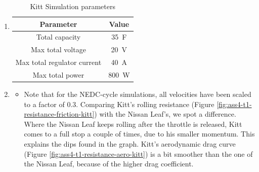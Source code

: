 \documentclass[11pt,titlepage]{report}
\begin{document}
\begin{enumerate}
\item
	\begin{table}[H]
		\centering
		\caption{Kitt Simulation parameters}
		\label{tab:ass4-sim-param-cap}
		\begin{tabular}{c c}
			\hline\hline
			Parameter & Value \\
			\hline
			Total capacity & \SI{35}{F} \cite{maxwell-dcell-datasheet} \\
			Max total voltage & \SI{20}{V} \\
			Max total regulator current & \SI{40}{A} \\
			Max total power & \SI{800}{W} \\
			\hline
			\end{tabular}
	\end{table}
\item
	\begin{itemize}
		\item
		Note that for the NEDC-cycle simulations, all velocities have been scaled to a factor of \num{0.3}.
		Comparing Kitt's rolling resistance (Figure \ref{fig:ass4-t1-resistance-friction-kitt}) with the Nissan Leaf's, we spot a difference. Where the Nissan Leaf keeps rolling after the throttle is released, Kitt comes to a full stop a couple of times, due to his smaller momentum. This explains the dips found in the graph. Kitt's aerodynamic drag curve (Figure \ref{fig:ass4-t1-resistance-aero-kitt}) is a bit smoother than the one of the Nissan Leaf, because of the higher drag coefficient.


\end{itemize}
\end{enumerate}
\end{document}
